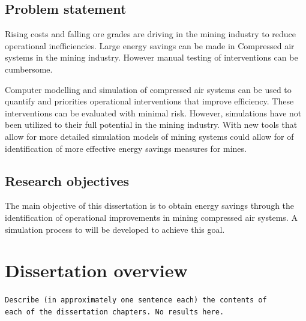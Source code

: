 	\subsection{Problem statement}
 		Rising costs and falling ore grades are driving in the mining industry to reduce operational inefficiencies. Large energy savings can be made in Compressed air systems in the mining industry. However manual testing of interventions can be cumbersome.
 		\par
 		Computer modelling and simulation of compressed air systems can be used to quantify and priorities operational interventions that improve efficiency. These interventions can be evaluated with minimal risk. However, simulations have not been utilized to their full potential in the mining industry. With new tools that allow for more detailed simulation models of mining systems could allow for of identification of more effective energy savings measures for mines.
	\subsection{Research objectives}
		The main objective of this dissertation is to obtain energy savings through the identification of operational improvements in mining compressed air systems. A simulation process to will be developed to achieve this goal.
\section{Dissertation overview}
	\texttt{Describe (in approximately one sentence each) the contents of \\each of the dissertation chapters. No results here.}